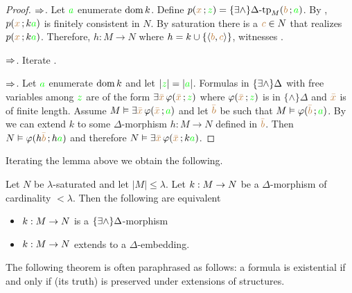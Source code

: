 \begin{proof}
$\Rightarrow$. Let ${\color{green} a}$ enumerate $\mathop{\rm dom} k$. Define $p({\color{brown} x}\,;{\color{green} z})=\{\exists\wedge\}\Delta\mbox{\rm -tp}_M ({\color{brown} b}\,;{\color{green} a})$. By , $p({\color{brown} x}\,;k{\color{green} a})$ is finitely consistent in $N$. By saturation there is a ${\color{brown} c}\in N$ that realizes $p({\color{brown} x}\,;k{\color{green} a})$. Therefore, $h:M\to N$ where $h=k\cup\{\langle{\color{brown}b},{\color{brown} c}\rangle\}$, witnesses .

$\Rightarrow$.
Iterate .

$\Rightarrow$. Let ${\color{green} a}$ enumerate $\mathop{\rm dom} k$ and let $|{\color{green} z}|=|{\color{green} a}|$. Formulas in $\{\exists\wedge\}\Delta$ with free variables among ${\color{green} z}$ are of the form  $\exists {\color{brown}\bar x}\, \varphi ({\color{brown}\bar x}\,;{\color{green} z})$ where $\varphi({\color{brown}\bar x}\,;{\color{green} z})$ is in $\{\wedge\}\Delta$ and ${\color{brown}\bar x}$ is of finite length.
Assume $M\vDash\exists{\color{brown}\bar x}\,\varphi({\color{brown}\bar x}\,;{\color{green} a})$ and let ${\color{brown}\bar b}$ be such that $M\vDash\varphi({\color{brown}\bar b}\,;{\color{green} a})$.
By  we can extend $k$ to some $\Delta$-morphism $h:M\to N$ defined in ${\color{brown}\bar b}$.
Then $N\vDash\varphi(h{\color{brown}\bar b}\,;h{\color{green} a})$ and therefore $N\vDash\exists {\color{brown}\bar x}\,\varphi({\color{brown}\bar x}\,;k{\color{green} a})$.
\end{proof}

Iterating the lemma above we obtain the following.

\begin{corollary}\label{corol_EDelta_estensione}
Let $N$ be $\lambda$-saturated and let $|M|\le\lambda$. Let $k:M\rightarrow N$ be a $\Delta$-morphism of cardinality $<\lambda$. Then the following are equivalent
\begin{itemize}
\item[1.] $k:M\rightarrow N$ is a $\{\exists\wedge\}\Delta$-morphism
\item[2.] $k:M\rightarrow N$ extends to a $\Delta$-embedding.
\end{itemize}
\end{corollary}

The following theorem is often paraphrased as follows: a formula is existential if and only if (its truth) is preserved under extensions of structures.

